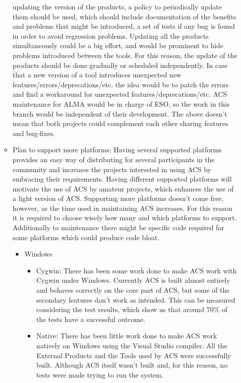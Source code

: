 \begin{itemize}
\begin{itemize}
			updating the version of the products, a policy to periodically update them should be used, which should include documentation of the 
			benefits and problems that might be introduced, a set of tests if any bug is found in order to avoid regression problems. Updating all 
			the products simultaneously could be a big effort, and would be prominent to hide problems introduced between the tools. For this 
			reason, the update of the products should be done gradually or scheduled independently. In case that a new version of a tool 
			introduces unexpected new features/errors/deprecations/etc. the idea would be to patch the errors and find a workaround for unexpected 
			features/deprecations/etc. ACS maintenance for ALMA would be in charge of ESO, so the work in this branch would be independent of their
			development. The above doesn't mean that both projects could complement each other sharing features and bug-fixes.
		\item Plan to support more platforms: Having several supported platforms provides an easy way of distributing for several participants in the 
			community and increases the projects interested in using ACS by embracing their requirements. Having different supported platforms will 
			motivate the use of ACS by amateur projects, which enhances the use of a light version of ACS. Supporting more platforms doesn't come free, 
			however, as the time used in maintaining ACS increases. For this reason it is required to choose wisely how many and which platforms to 
			support. Additionally to maintenance there might be specific code required for some platforms which could produce code bloat.
		\begin{itemize}
			\item Windows
			\begin{itemize}
				\item Cygwin: There has been some work done to make ACS work with Cygwin under Windows. Currently ACS is built almost entirely and 
					behaves correctly on the core part of ACS, but some of the secondary features don't work as intended. This can be measured 
					considering the test results, which show us that around 70\% of the tests have a successful outcome.
				\item Native: There has been little work done to make ACS work natively on Windows using the Visual Studio compiler. All the External 
					Products and the Tools used by ACS were successfully built. Although ACS itself wasn't built and, for this reason, no tests 
					were made trying to run the system.

\end{itemize}
\end{itemize}
\end{itemize}
\end{itemize}
